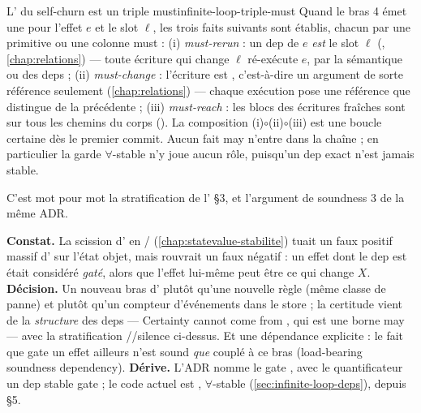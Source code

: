 \begin{proposition}{L'\Error{} du self-churn est un triple must}{infinite-loop-triple-must}
Quand le bras 4 émet une \Error{} pour l'effet $e$ et le slot $\ell$, les trois faits suivants sont établis, chacun par une primitive ou une colonne must : (i) \emph{must-rerun} : un dep de $e$ \emph{est} le slot $\ell$ (, \cref{chap:relations}) --- toute écriture qui change $\ell$ ré-exécute $e$, par la sémantique \og ou\fg{} des deps ; (ii) \emph{must-change} : l'écriture est , c'est-à-dire un argument de sorte référence  seulement (\cref{chap:relations}) --- chaque exécution pose une référence que  distingue de la précédente ; (iii) \emph{must-reach} : les blocs des écritures fraîches sont sur tous les chemins du corps (). La composition (i)$\circ$(ii)$\circ$(iii) est une boucle certaine dès le premier commit. Aucun fait may n'entre dans la chaîne ; en particulier la garde $\forall$-stable n'y joue aucun rôle, puisqu'un dep exact n'est jamais stable.
\end{proposition}

C'est mot pour mot la stratification de l' §3, et l'argument de soundness 3 de la même ADR.

\begin{decision}
\textbf{Constat.} La scission d' en / (\cref{chap:statevalue-stabilite}) tuait un faux positif massif d' sur l'état objet, mais rouvrait un faux négatif : un effet dont le dep est  était considéré \emph{gaté}, alors que l'effet lui-même peut être ce qui change $X$.
\textbf{Décision.} Un nouveau bras d' plutôt qu'une nouvelle règle (même classe de panne) et plutôt qu'un compteur d'événements dans le store ; la certitude vient de la \emph{structure} des deps --- \og Certainty cannot come from \fg, qui est une borne may --- avec la stratification \Error{}/\Warning{}/silence ci-dessus. Et une dépendance explicite : le fait que  gate un effet ailleurs n'est sound \emph{que} couplé à ce bras (\og load-bearing soundness dependency\fg).
\textbf{Dérive.} L'ADR nomme le gate , avec le quantificateur \og un dep stable gate\fg{} ; le code actuel est , $\forall$-stable (\cref{sec:infinite-loop-deps}), depuis  §5.
\end{decision}

